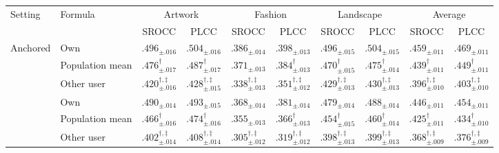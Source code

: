 \begin{tabular}{ll cc cc cc cc}
\toprule
\multirow{2}{*}{Setting} & \multirow{2}{*}{Formula} & \multicolumn{2}{c}{Artwork} & \multicolumn{2}{c}{Fashion} & \multicolumn{2}{c}{Landscape} & \multicolumn{2}{c}{Average} \\
\cmidrule(lr){3-4}\cmidrule(lr){5-6}\cmidrule(lr){7-8}\cmidrule(lr){9-10}
& & SROCC & PLCC & SROCC & PLCC & SROCC & PLCC & SROCC & PLCC \\
\midrule
\multirow{3}{*}{Anchored} & Own & $\bm{.496_{\pm .016}}$ & $\bm{.504_{\pm .016}}$ & $\bm{.386_{\pm .014}}$ & $\bm{.398_{\pm .013}}$ & $\bm{.496_{\pm .015}}$ & $\bm{.504_{\pm .015}}$ & $\bm{.459_{\pm .011}}$ & $\bm{.469_{\pm .011}}$ \\
& Population mean & $.476_{\pm .017}^{\dagger}$ & $.487_{\pm .017}^{\dagger}$ & $.371_{\pm .013}$ & $.384_{\pm .013}^{\dagger}$ & $.470_{\pm .015}^{\dagger}$ & $.475_{\pm .014}^{\dagger}$ & $.439_{\pm .011}^{\dagger}$ & $.449_{\pm .011}^{\dagger}$ \\
& Other user & $.420_{\pm .016}^{\dagger,\ddagger}$ & $.428_{\pm .015}^{\dagger,\ddagger}$ & $.338_{\pm .013}^{\dagger,\ddagger}$ & $.351_{\pm .012}^{\dagger,\ddagger}$ & $.429_{\pm .013}^{\dagger,\ddagger}$ & $.430_{\pm .013}^{\dagger,\ddagger}$ & $.396_{\pm .010}^{\dagger,\ddagger}$ & $.403_{\pm .010}^{\dagger,\ddagger}$ \\
\addlinespace
\multirow{3}{*}{Unanchored} & Own & $\bm{.490_{\pm .014}}$ & $\bm{.493_{\pm .015}}$ & $\bm{.368_{\pm .014}}$ & $\bm{.381_{\pm .014}}$ & $\bm{.479_{\pm .014}}$ & $\bm{.488_{\pm .014}}$ & $\bm{.446_{\pm .011}}$ & $\bm{.454_{\pm .011}}$ \\
& Population mean & $.466_{\pm .016}^{\dagger}$ & $.474_{\pm .016}^{\dagger}$ & $.355_{\pm .013}$ & $.366_{\pm .013}^{\dagger}$ & $.454_{\pm .015}^{\dagger}$ & $.460_{\pm .014}^{\dagger}$ & $.425_{\pm .011}^{\dagger}$ & $.434_{\pm .010}^{\dagger}$ \\
& Other user & $.402_{\pm .014}^{\dagger,\ddagger}$ & $.408_{\pm .014}^{\dagger,\ddagger}$ & $.305_{\pm .012}^{\dagger,\ddagger}$ & $.319_{\pm .012}^{\dagger,\ddagger}$ & $.398_{\pm .013}^{\dagger,\ddagger}$ & $.399_{\pm .013}^{\dagger,\ddagger}$ & $.368_{\pm .009}^{\dagger,\ddagger}$ & $.376_{\pm .009}^{\dagger,\ddagger}$ \\
\bottomrule
\end{tabular}
